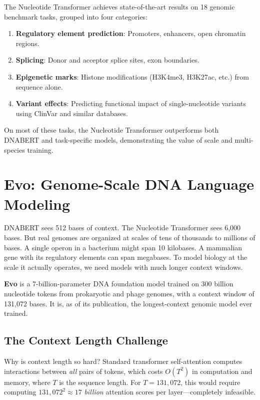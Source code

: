 The Nucleotide Transformer achieves state-of-the-art results on 18 genomic benchmark tasks, grouped into four categories:

\begin{enumerate}[leftmargin=1.8em]
  \item \textbf{Regulatory element prediction}: Promoters, enhancers, open chromatin regions.
  \item \textbf{Splicing}: Donor and acceptor splice sites, exon boundaries.
  \item \textbf{Epigenetic marks}: Histone modifications (H3K4me3, H3K27ac, etc.) from sequence alone.
  \item \textbf{Variant effects}: Predicting functional impact of single-nucleotide variants using ClinVar and similar databases.
\end{enumerate}

On most of these tasks, the Nucleotide Transformer outperforms both DNABERT and task-specific models, demonstrating the value of scale and multi-species training.

\section{Evo: Genome-Scale DNA Language Modeling}
\label{sec:evo}

DNABERT sees 512 bases of context. The Nucleotide Transformer sees 6,000 bases. But real genomes are organized at scales of tens of thousands to millions of bases. A single operon in a bacterium might span 10 kilobases. A mammalian gene with its regulatory elements can span megabases. To model biology at the scale it actually operates, we need models with much longer context windows.

\textbf{Evo} \citep{nguyen2024} is a 7-billion-parameter DNA foundation model trained on 300 billion nucleotide tokens from prokaryotic and phage genomes, with a context window of 131,072 bases. It is, as of its publication, the longest-context genomic model ever trained.

\subsection{The Context Length Challenge}

Why is context length so hard? Standard transformer self-attention computes interactions between \emph{all} pairs of tokens, which costs $O(T^2)$ in computation and memory, where $T$ is the sequence length. For $T = 131{,}072$, this would require computing $131{,}072^2 \approx 17$ \emph{billion} attention scores per layer---completely infeasible.

